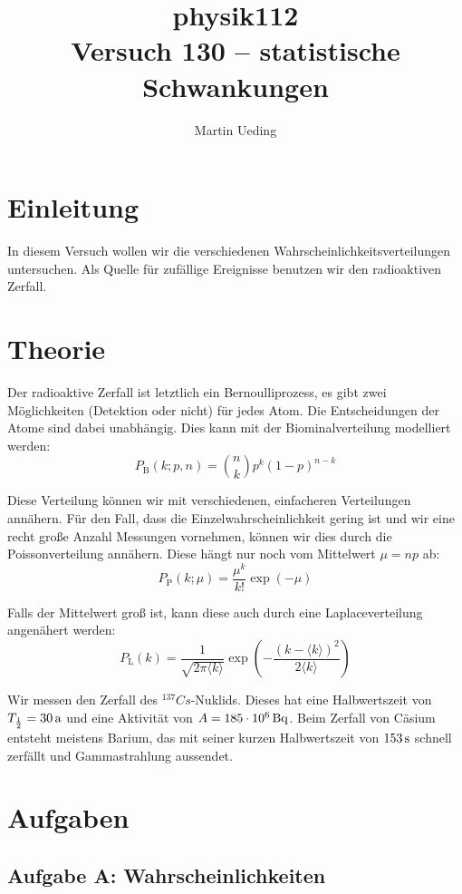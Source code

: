 \documentclass[11pt]{article}
\title{physik112 \\ Versuch 130 -- statistische Schwankungen}
\author{Martin Ueding}
\newcommand{\e}[1]{\cdot 10^{#1}}
\newcommand{\half}{\frac{1}{2}}
\begin{document}
\maketitle

\tableofcontents

\newpage

\section{Einleitung}

In diesem Versuch wollen wir die verschiedenen Wahrscheinlichkeitsverteilungen
untersuchen. Als Quelle für zufällige Ereignisse benutzen wir den radioaktiven
Zerfall.

\section{Theorie}

Der radioaktive Zerfall ist letztlich ein Bernoulliprozess, es gibt zwei Möglichkeiten (Detektion oder nicht) für jedes Atom. Die Entscheidungen der Atome sind dabei unabhängig. Dies kann mit der Biominalverteilung modelliert werden:
\[ P_\mathrm{B} (k; p, n) = \binom nk p^k (1-p)^{n-k} \]

Diese Verteilung können wir mit verschiedenen, einfacheren Verteilungen
annähern. Für den Fall, dass die Einzelwahrscheinlichkeit gering ist und wir
eine recht große Anzahl Messungen vornehmen, können wir dies durch die
Poissonverteilung annähern. Diese hängt nur noch vom Mittelwert $\mu = np$ ab:
\[ P_\mathrm{P} (k; \mu) = \frac{\mu^k}{k!} \exp(-\mu) \]

Falls der Mittelwert groß ist, kann diese auch durch eine Laplaceverteilung angenähert werden:
\[ P_\mathrm{L} (k) = \frac 1{\sqrt{2 \pi \langle k \rangle}} \exp\left(-\frac{(k-\langle k \rangle)^2}{2 \langle k \rangle} \right) \]

Wir messen den Zerfall des $^{137}Cs$-Nuklids. Dieses hat eine Halbwertszeit von $T_\half = \unit[30]a$ und eine Aktivität von $A = \unit[185 \e 6]{Bq}$. Beim Zerfall von Cäsium entsteht meistens Barium, das mit seiner kurzen Halbwertszeit von $\unit[153]s$ schnell zerfällt und Gammastrahlung aussendet.

\section{Aufgaben}

\subsection{Aufgabe A: Wahrscheinlichkeiten}
\end{document}

